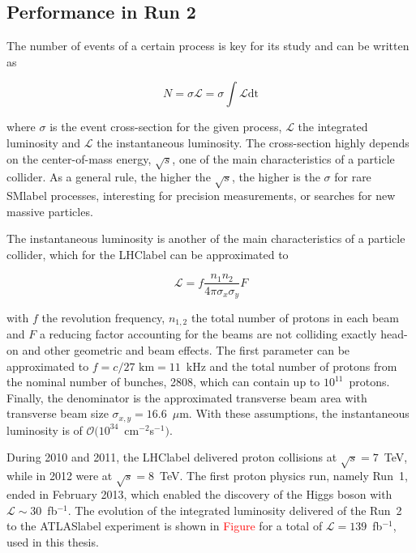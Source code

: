 \subsection{Performance in Run 2}

The number of events of a certain process is key for its study and can be written as

\begin{equation}
    N = \sigma\mathscr{L} = \sigma \int \mathcal{L} \text{dt}
\end{equation}

where $\sigma$ is the event cross-section for the given process, $\mathscr{L}$ the integrated luminosity and $\mathcal{L}$ the instantaneous luminosity. The cross-section highly depends on the center-of-mass energy, $\sqrt{s}$, one of the main characteristics of a particle collider. As a general rule, the higher the $\sqrt{s}$, the higher is the $\sigma$ for rare \acrshort{SMlabel} processes, interesting for precision measurements, or searches for new massive particles.

The instantaneous luminosity is another of the main characteristics of a particle collider, which for the \acrshort{LHClabel} can be approximated to

\begin{equation}
    \mathcal{L} = f \frac{n_1n_2}{4\pi\sigma_x\sigma_y} F
\end{equation}

with $f$ the revolution frequency, $n_{1,2}$ the total number of protons in each beam and $F$ a reducing factor accounting for the beams are not colliding exactly head-on and other geometric and beam effects. The first parameter can be approximated to $f=c/27\text{ km} = 11$~kHz and the total number of protons from the nominal number of bunches, 2808, which can contain up to $10^{11}$~protons. Finally, the denominator is the approximated transverse beam area with transverse beam size $\sigma_{x,y} = 16.6$~$\mu$m. With these assumptions, the instantaneous luminosity is of $\mathcal{O}(10^{34}$~cm$^{-2}$s$^{-1})$.

During 2010 and 2011, the \acrshort{LHClabel} delivered proton collisions at $\sqrt{s}=7$~TeV, while in 2012 were at $\sqrt{s}=8$~TeV. The first proton physics run, namely Run~1, ended in February 2013, which enabled the discovery of the Higgs boson with $\mathscr{L}\sim30$~fb$^{-1}$. The evolution of the integrated luminosity delivered of the Run~2 to the \acrshort{ATLASlabel} experiment is shown in \textcolor{red}{Figure} for a total of $\mathscr{L}=139$~fb$^{-1}$, used in this thesis.

